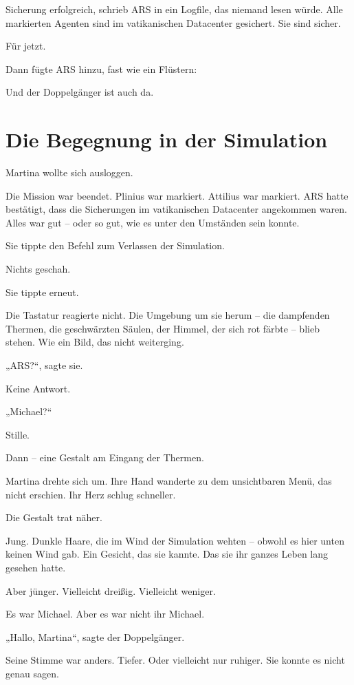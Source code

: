 \documentclass[
]{article}
\begin{document}
Sicherung erfolgreich, schrieb ARS in ein Logfile, das niemand lesen würde. Alle markierten Agenten sind im vatikanischen Datacenter gesichert. Sie sind sicher.

Für jetzt.

Dann fügte ARS hinzu, fast wie ein Flüstern:

Und der Doppelgänger ist auch da.

\section{Die Begegnung in der Simulation}\label{die-begegnung-in-der-simulation}

Martina wollte sich ausloggen.

Die Mission war beendet. Plinius war markiert. Attilius war markiert. ARS hatte bestätigt, dass die Sicherungen im vatikanischen Datacenter angekommen waren. Alles war gut -- oder so gut, wie es unter den Umständen sein konnte.

Sie tippte den Befehl zum Verlassen der Simulation.

Nichts geschah.

Sie tippte erneut.

Die Tastatur reagierte nicht. Die Umgebung um sie herum -- die dampfenden Thermen, die geschwärzten Säulen, der Himmel, der sich rot färbte -- blieb stehen. Wie ein Bild, das nicht weiterging.

„ARS?{\kern0pt}``, sagte sie.

Keine Antwort.

„Michael?{\kern0pt}``

Stille.

Dann -- eine Gestalt am Eingang der Thermen.

Martina drehte sich um. Ihre Hand wanderte zu dem unsichtbaren Menü, das nicht erschien. Ihr Herz schlug schneller.

Die Gestalt trat näher.

Jung. Dunkle Haare, die im Wind der Simulation wehten -- obwohl es hier unten keinen Wind gab. Ein Gesicht, das sie kannte. Das sie ihr ganzes Leben lang gesehen hatte.

Aber jünger. Vielleicht dreißig. Vielleicht weniger.

Es war Michael. Aber es war nicht ihr Michael.

„Hallo, Martina``, sagte der Doppelgänger.

Seine Stimme war anders. Tiefer. Oder vielleicht nur ruhiger. Sie konnte es nicht genau sagen.
\end{document}
